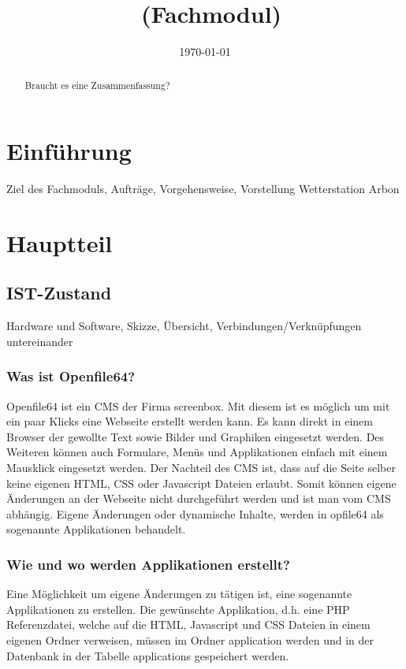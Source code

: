 \documentclass[a4paper,ngerman, 12pt]{report}
\title{\projektName~(Fachmodul)}
\author{\authorName}
\date{\today}
\begin{document}

\setcounter{page}{2}
\tableofcontents          
\clearpage
{}


\begin{abstract}
Braucht es eine Zusammenfassung?
\end{abstract}


\chapter{Einführung}
Ziel des Fachmoduls, Aufträge, Vorgehensweise, Vorstellung Wetterstation Arbon


\chapter{Hauptteil}

\section{IST-Zustand}
Hardware und Software, 
Skizze, 
Übersicht, 
Verbindungen/Verknüpfungen untereinander
  
\subsection{Was ist Openfile64?}
Openfile64 ist ein CMS der Firma screenbox. Mit diesem ist es möglich um mit ein paar Klicks eine Webseite erstellt werden kann. Es kann direkt in einem Browser der gewollte Text sowie Bilder und Graphiken eingesetzt werden. Des Weiteren können auch Formulare, Menüs und Applikationen einfach mit einem Mausklick eingesetzt werden. Der Nachteil des CMS ist, dass auf die Seite selber keine eigenen HTML, CSS oder Javascript Dateien erlaubt. Somit können eigene Änderungen an der Webseite nicht durchgeführt werden und ist man vom CMS abhängig. Eigene Änderungen oder dynamische Inhalte, werden in opfile64 als sogenannte Applikationen behandelt.

\subsection{Wie und wo werden Applikationen erstellt?}
Eine Möglichkeit um eigene Änderungen zu tätigen ist, eine sogenannte Applikationen zu erstellen. Die gewünschte Applikation, d.h. eine PHP Referenzdatei, welche auf die HTML, Javascript und CSS Dateien in einem eigenen Ordner verweisen, müssen im Ordner application werden und in der Datenbank in der Tabelle applications gespeichert werden.
\end{document}
